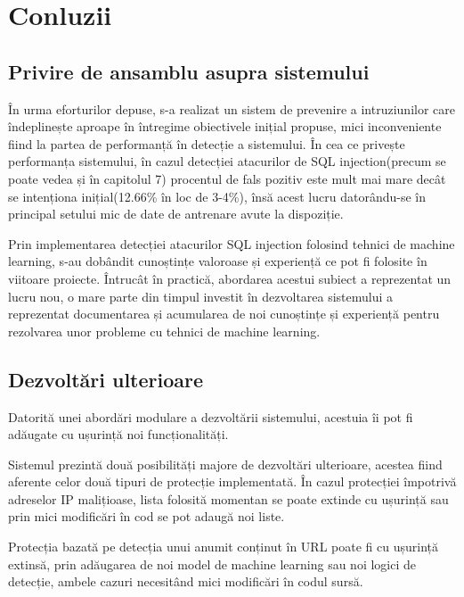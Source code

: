 
 \chapter{Conluzii}
\label{cap:concluzii}
\section{Privire de ansamblu asupra sistemului}

În urma eforturilor depuse, s-a realizat un sistem de prevenire a intruziunilor care îndeplinește aproape în întregime obiectivele inițial propuse, mici inconveniente fiind la partea de performanță în detecție a sistemului. În cea ce privește performanța sistemului, în cazul detecției atacurilor de SQL injection(precum se poate vedea și în capitolul 7) procentul de fals pozitiv este mult mai mare decât se intenționa inițial(12.66\% în loc de 3-4\%), însă acest lucru datorându-se în principal setului mic de date de antrenare avute la dispoziție. 

Prin implementarea detecției atacurilor SQL injection folosind tehnici de machine learning, s-au dobândit cunoștințe valoroase și experiență ce pot fi folosite în viitoare proiecte. Întrucât în practică, abordarea acestui subiect a reprezentat un lucru nou, o mare parte din timpul investit în dezvoltarea sistemului a reprezentat documentarea și acumularea de noi cunoștințe și experiență pentru rezolvarea unor probleme cu tehnici de machine learning. 

\section{Dezvoltări ulterioare}

Datorită unei abordări modulare a dezvoltării sistemului, acestuia îi pot fi adăugate cu ușurință noi funcționalități. 

Sistemul prezintă două posibilități majore de dezvoltări ulterioare, acestea fiind aferente celor două tipuri de protecție implementată. În cazul protecției împotrivă adreselor IP malițioase, lista folosită momentan se poate extinde cu ușurință sau prin mici modificări în cod se pot adaugă noi liste. 

Protecția bazată pe detecția unui anumit conținut în URL poate fi cu ușurință extinsă, prin adăugarea de noi model de machine learning sau noi logici de detecție, ambele cazuri necesitând mici modificări în codul sursă. 

